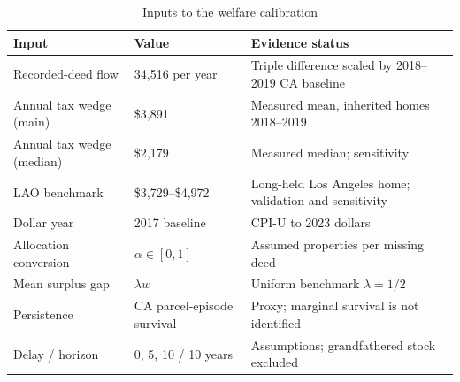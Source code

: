 \begin{table}[!ht]\centering
\caption{Inputs to the welfare calibration}\label{tab:welfare_inputs}
{\small
\begin{tabular}{p{}p{}p{}}\toprule
Input & Value & Evidence status \\
\midrule
Recorded-deed flow & 34,516 per year & Triple difference scaled by 2018--2019 CA baseline \\
Annual tax wedge (main) & \$3,891 & Measured mean, inherited homes 2018--2019 \\
Annual tax wedge (median) & \$2,179 & Measured median; sensitivity \\
LAO benchmark & \$3,729--\$4,972 & Long-held Los Angeles home; validation and sensitivity \\
Dollar year & 2017 baseline & CPI-U to 2023 dollars \\
Allocation conversion & $\alpha\in[0,1]$ & Assumed properties per missing deed \\
Mean surplus gap & $\lambda w$ & Uniform benchmark $\lambda=1/2$ \\
Persistence & CA parcel-episode survival & Proxy; marginal survival is not identified \\
Delay / horizon & 0, 5, 10 / 10 years & Assumptions; grandfathered stock excluded \\
\bottomrule\end{tabular}}
\begin{minipage}{0.96\textwidth}\end{minipage}\end{table}
